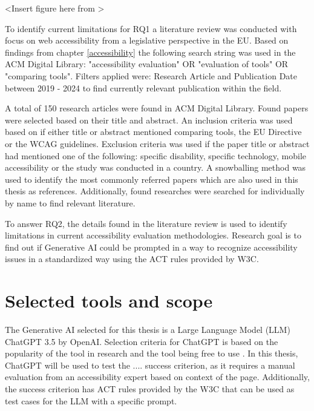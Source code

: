 <Insert figure here from \cite{iterativedesignscience}>

To identify current limitations for RQ1 a literature review was conducted with focus on web accessibility from a legislative perspective in the EU. Based on findings from chapter \ref{accessibility} the following search string was used in the ACM Digital Library: "accessibility evaluation" OR "evaluation of tools" OR "comparing tools". Filters applied were: Research Article and Publication Date between 2019 - 2024 to find currently relevant publication within the field. 

A total of 150 research articles were found in ACM Digital Library. Found papers were selected based on their title and abstract. An inclusion criteria was used based on if either title or abstract mentioned comparing tools, the EU Directive or the WCAG guidelines. Exclusion criteria was used if the paper title or abstract had mentioned one of the following: specific disability, specific technology, mobile accessibility or the study was conducted in a country. A snowballing method was used to identify the most commonly referred papers which are also used in this thesis as references. Additionally, found researches were searched for individually by name to find relevant literature.

To answer RQ2, the details found in the literature review is used to identify limitations in current accessibility evaluation methodologies. Research goal is to find out if Generative AI could be prompted in a way to recognize accessibility issues in a standardized way using the ACT rules provided by W3C.

\section{Selected tools and scope}

The Generative AI selected for this thesis is a Large Language Model (LLM) ChatGPT 3.5 by OpenAI. Selection criteria for ChatGPT is based on the popularity of the tool in research and the tool being free to use \citep{ouyang2023llm, white2023prompt}. In this thesis, ChatGPT will be used to test the .... success criterion, as it requires a manual evaluation from an accessibility expert based on context of the page. Additionally, the success criterion has ACT rules provided by the W3C that can be used as test cases for the LLM with a specific prompt.